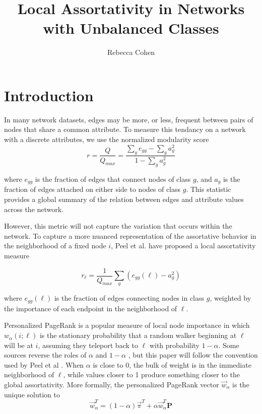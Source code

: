 \documentclass[12pt]{article}
\title{Local Assortativity in Networks with Unbalanced Classes}
\author{Rebecca Cohen}
\begin{document}
\maketitle
\section{Introduction}

In many network datasets, edges may be more, or less, frequent between pairs of nodes that share a common attribute.  To measure this tendancy on a network with a discrete attributes, we use the normalized modularity score
 \begin{equation}
   r = \frac{Q}{Q_{max}} = \frac{\sum_g e_{gg} - \sum_g a_g^2} {1 - \sum_g a_g^2}
 \end{equation} \cite{newman:2003}
 
 where $e_{gg}$ is the fraction of edges that connect nodes of class $g$, and $a_g$ is the fraction of edges attached on either side to nodes of class $g$.  This statistic provides a global summary of the relation between edges and attribute values across the network.  
 
However, this metric will not capture the variation that occurs within the network.  To capture a more nuanced representation of the assortative behavior in the neighborhood of a fixed node $i$, Peel et al. have proposed a local assortativity measure

\begin{equation}
  r_\ell = \frac{1}{Q_{max}} \sum_g (e_{gg}(\ell) - a_g^2)
\end{equation}

where $e_{gg}(\ell)$ is the fraction of edges connecting nodes in class $g$, weighted by the importance of each endpoint in the neighborhood of $\ell$.  

Personalized PageRank is a popular measure of local node importance in which $w_\alpha(i; \ell)$ is the stationary probability that a random walker beginning at $\ell$ will be at $i$, assuming they teleport back to $\ell$ with probability $1-\alpha$.  Some sources reverse the roles of $\alpha$ and $1 - \alpha$ \cite{chen:2020}, but this paper will follow the convention used by Peel et al \cite{Peel:2018}.  When $\alpha$ is close to 0, the bulk of weight is in the immediate neighborhood of $\ell$, while values closer to 1 produce something closer to the global assortativity.  More formally, the personalized PageRank vector $\vec{w}_\alpha$ is the unique solution to
\begin{equation}
  \vec{w}_\alpha^T = (1 - \alpha) \vec{\pi}^T + \alpha \vec{w}_\alpha^T \mathbf{P}
\end{equation}
\end{document}
